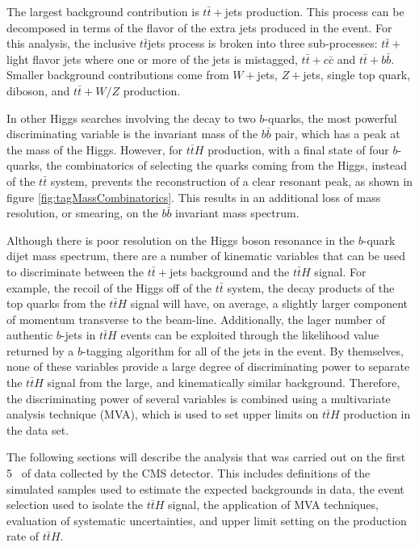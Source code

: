 \par The largest background contribution is $t\bar{t}+$jets
production.  This process can be decomposed in terms of the flavor of
the extra jets produced in the event.  For this analysis, the
inclusive $t\bar{t}$jets process is broken into three sub-processes:
$t\bar{t}+$ light flavor jets where one or more 
of the jets is mistagged, $t\bar{t}+c\bar{c}$ and $t\bar{t}+b\bar{b}$.
Smaller background contributions come from $W+$jets, $Z+$jets, single
top quark, diboson, and $t\bar{t}+W/Z$ production.  

\par In other Higgs searches involving the decay to two $b$-quarks,
the most powerful discriminating variable is the invariant mass of the
$b\bar{b}$ pair, which has a peak at the mass of the Higgs.  However, for
$t\bar{t}H$ production, with a final state of four $b$-quarks, the
combinatorics of selecting the quarks coming from the Higgs, instead
of the $t\bar{t}$ system, prevents the reconstruction of a clear
resonant peak, as shown in figure \ref{fig:tagMassCombinatorics}.
This results in an additional loss of mass resolution, or smearing,
on the $b\bar{b}$ invariant mass spectrum. 

\par Although there is poor resolution on the Higgs boson resonance in
the $b$-quark dijet mass spectrum, there are a number of kinematic
variables that can be used to discriminate between the $t\bar{t}+$jets
background and the $t\bar{t}H$ signal.  For example, the recoil of
the Higgs off of the $t\bar{t}$ system, the decay products of the top
quarks from the $t\bar{t}H$ signal will have, on average, a slightly
larger component of momentum transverse to the beam-line.
Additionally, the lager number of authentic $b$-jets in $t\bar{t}H$
events can be exploited through the likelihood value returned by a
$b$-tagging algorithm for all of the jets in the event.  By
themselves, none of these variables provide a large degree of
discriminating power to separate the $t\bar{t}H$ signal from the
large, and kinematically similar background.  Therefore, the
discriminating power of several variables is combined using a
multivariate analysis technique (MVA), which is used to set upper
limits on $t\bar{t}H$ production in the data set. 

\par The following sections will describe the analysis that was
carried out on the first 5 \fbinv~of data collected by the CMS
detector.  This includes definitions of the simulated samples used to
estimate the expected backgrounds in data, the event selection used to
isolate the $t\bar{t}H$ signal, the application of MVA techniques,
evaluation of systematic uncertainties, and upper limit setting on the
production rate of $t\bar{t}H$. 


